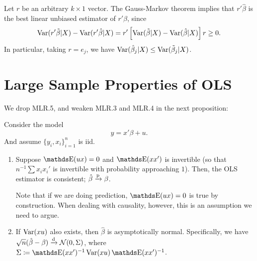 \documentclass[letterpaper, 10pt]{article}
\begin{document}
\begin{corollary}
  Let \(r\) be an arbitrary \(k \times 1\) vector.
  The Gauss-Markov theorem implies that \(r' \hat{\beta}\) is the best linear unbiased estimator of \(r' \beta\), since
  \[
    \operatorname{Var}(r' \tilde{\beta} | X) - \operatorname{Var}(r' \hat{\beta} | X)
    = r' \left[ \operatorname{Var}(\tilde{\beta} | X) - \operatorname{Var}(\hat{\beta} | X) \right] r
    \geq 0.
  \]
  In particular, taking \(r = e_j\), we have \(\operatorname{Var}(\hat{\beta}_j | X) \leq \operatorname{Var}(\tilde{\beta}_j | X)\).
\end{corollary}


\section{Large Sample Properties of OLS}
We drop MLR.5, and weaken MLR.3 and MLR.4 in the next proposition:
\begin{proposition}\label{prop:OLS-asymptotic-normality}
  Consider the model
  \[
    y = x' \beta + u.
  \]
  And assume \(\{y_i, x_i\}_{i = 1}^n\) is iid.
  \begin{enumerate}[label=(\roman*)]
    \item Suppose \(\E(ux) = 0\) and \(\E(xx')\) is invertible (so that \(n^{-1} \sum x_i x_i'\) is invertible with probability approaching \(1\)).
      Then, the OLS estimator is consistent; \(\hat{\beta} \xrightarrow{\mathrm{p}} \beta\).

      Note that if we are doing prediction, \(\E(ux) = 0\) is true by construction.
      When dealing with causality, however, this is an assumption we need to argue.
    \item If \(\operatorname{Var}(xu)\) also exists, then \(\hat{\beta}\) is asymptotically normal.
      Specifically, we have \(\sqrt{n}(\hat{\beta} - \beta) \xrightarrow{\mathrm{d}} \mathcal{N}(0, \Sigma)\), where \(\Sigma \coloneqq \E(xx')^{-1} \Var(xu) \E(xx')^{-1}\).
  \end{enumerate}
\end{proposition}
\end{document}
